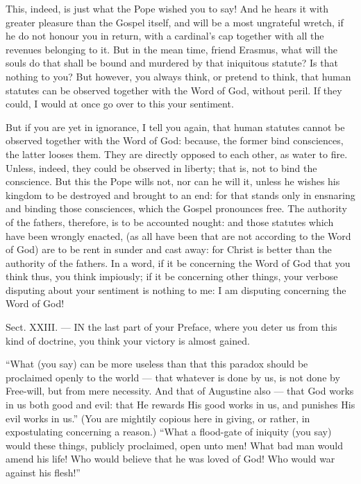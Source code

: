 This, indeed, is just what the Pope wished you to say! And he hears it with greater pleasure than the Gospel itself, and will be a most ungrateful wretch, if he do not honour you in return, with a cardinal’s cap together with all the revenues belonging to it. But in the mean time, friend Erasmus, what will the souls do that shall be bound and murdered by that iniquitous statute? Is that nothing to you? But however, you always think, or pretend to think, that human statutes can be observed together with the Word of God, without peril. If they could, I would at once go over to this your sentiment.

But if you are yet in ignorance, I tell you again, that human statutes cannot be observed together with the Word of God: because, the former bind consciences, the latter looses them. They are directly opposed to each other, as water to fire. Unless, indeed, they could be observed in liberty; that is, not to bind the conscience. But this the Pope wills not, nor can he will it, unless he wishes his kingdom to be destroyed and brought to an end: for that stands only in ensnaring and binding those consciences, which the Gospel pronounces free. The authority of the fathers, therefore, is to be accounted nought: and those statutes which have been wrongly enacted, (as all have been that are not according to the Word of God) are to be rent in sunder and cast away: for Christ is better than the authority of the fathers. In a word, if it be concerning the Word of God that you think thus, you think impiously; if it be concerning other things, your verbose disputing about your sentiment is nothing to me: I am disputing concerning the Word of God!


Sect. XXIII. — IN the last part of your Preface, where you deter us from this kind of doctrine, you think your victory is almost gained.

“What (you say) can be more useless than that this paradox should be proclaimed openly to the world — that whatever is done by us, is not done by Free-will, but from mere necessity. And that of Augustine also — that God works in us both good and evil: that He rewards His good works in us, and punishes His evil works in us.” (You are mightily copious here in giving, or rather, in expostulating concerning a reason.) “What a flood-gate of iniquity (you say) would these things, publicly proclaimed, open unto men! What bad man would amend his life! Who would believe that he was loved of God! Who would war against his flesh!”

